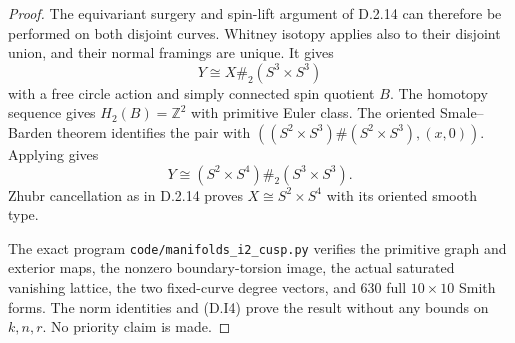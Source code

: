 \begin{proof}
The equivariant surgery and spin-lift argument of D.2.14
can therefore be performed on both disjoint curves.
Whitney isotopy applies also to their disjoint union,
and their normal framings are unique. It gives
\[
            Y\cong X\#_2(S^3\times S^3)
\]
with a free circle action and simply connected spin
quotient $B$. The homotopy sequence gives
$H_2(B)=\mathbb Z^2$ with primitive Euler class.
The oriented Smale--Barden theorem identifies the pair
with $((S^2\times S^3)\#(S^2\times S^3),(x,0))$.
Applying \cite[Theorem A and Theorem B(2)]{manGR25}
gives
\[
              Y\cong(S^2\times S^4)\#_2(S^3\times S^3).
\]
Zhubr cancellation as in D.2.14 proves
$X\cong S^2\times S^4$ with its oriented smooth type.

The exact program \texttt{code/manifolds\_i2\_cusp.py}
verifies the primitive graph and exterior maps, the
nonzero boundary-torsion image, the actual saturated
vanishing lattice, the two fixed-curve degree vectors,
and 630 full $10\times10$ Smith forms.
The norm identities and (D.I4) prove the result without
any bounds on $k,n,r$. No priority claim is made.
\end{proof}

